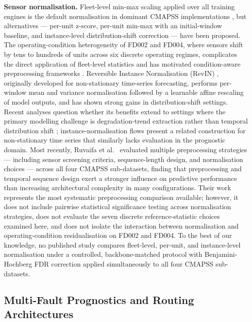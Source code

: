 \documentclass[preprint,10pt]{elsarticle}
\begin{document}
\textbf{Sensor normalisation.} Fleet-level min-max scaling applied over all training engines is the default normalisation in dominant CMAPSS implementations \cite{ref05,ref06,ref09}, but alternatives --- per-unit z-score, per-unit min-max with an initial-window baseline, and instance-level distribution-shift correction --- have been proposed. The operating-condition heterogeneity of FD002 and FD004, where sensors shift by tens to hundreds of units across six discrete operating regimes, complicates the direct application of fleet-level statistics and has motivated condition-aware preprocessing frameworks \cite{ref10,ref24}. Reversible Instance Normalisation (RevIN) \cite{ref23}, originally developed for non-stationary time-series forecasting, performs per-window mean and variance normalisation followed by a learnable affine rescaling of model outputs, and has shown strong gains in distribution-shift settings. Recent analyses question whether its benefits extend to settings where the primary modelling challenge is degradation-trend extraction rather than temporal distribution shift \cite{ref25,ref26}; instance-normalisation flows \cite{ref28} present a related construction for non-stationary time series that similarly lacks evaluation in the prognostic domain. Most recently, Ruvaifa et al.\ \cite{ref52} evaluated multiple preprocessing strategies --- including sensor screening criteria, sequence-length design, and normalisation choices --- across all four CMAPSS sub-datasets, finding that preprocessing and temporal sequence design exert a stronger influence on predictive performance than increasing architectural complexity in many configurations. Their work represents the most systematic preprocessing comparison available; however, it does not include pairwise statistical significance testing across normalisation strategies, does not evaluate the seven discrete reference-statistic choices examined here, and does not isolate the interaction between normalisation and operating-condition residualisation on FD002 and FD004. To the best of our knowledge, no published study compares fleet-level, per-unit, and instance-level normalisation under a controlled, backbone-matched protocol with Benjamini-Hochberg FDR correction applied simultaneously to all four CMAPSS sub-datasets.

\subsection{Multi-Fault Prognostics and Routing Architectures}
\end{document}
